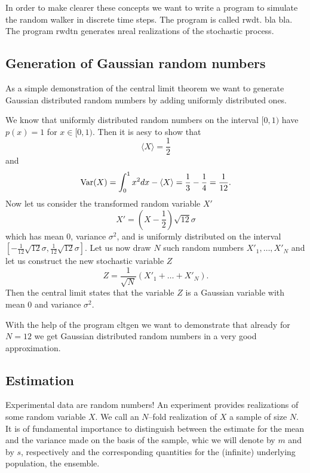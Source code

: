In order to make clearer these concepts we want to write a program 
to simulate the random walker in discrete time steps. The program
is called {\sf rwdt}. bla bla.
The program {\sf rwdtn} generates {\sf nreal} realizations of the 
stochastic process.

\subsection{Generation of Gaussian random numbers}
As a simple demonstration of the central limit theorem we want to 
generate Gaussian distributed random numbers by adding uniformly 
distributed ones.

We know that uniformly distributed random numbers on the interval
$[0,1)$ have $p(x) =1$ for $x\in[0,1)$. Then it is aesy to show 
that 
\begin{equation*}
\langle X\rangle = \frac{1}{2}
\end{equation*}
and
\begin{equation*}
{\rm Var}(X) = \int_0^1 x^2 dx - \langle X\rangle = \frac{1}{3} 
        -\frac{1}{4} = \frac{1}{12}.
\end{equation*}
Now let us consider the transformed random variable $X'$
\begin{equation*}
X' = (X - \frac{1}{2})\sqrt{12} \sigma
\end{equation*}
which has mean $0$, variance $\sigma^2$, and is uniformly 
distributed on the interval 
$[-\frac{1}{12} \sqrt{12} \sigma, \frac{1}{12} \sqrt{12} \sigma].$
Let us now draw $N$ such random numbers $X'_1,\ldots, X'_N$
and let us construct
the new stochastic variable $Z$
\begin{equation*}
Z= \frac{1}{\sqrt{N}} (X'_1 + \ldots + X'_N).
\end{equation*}
Then the central limit states that the variable $Z$ is a Gaussian
variable with mean $0$ and variance $\sigma^2$.

With the help of the program {\sf cltgen} we want to demonstrate 
that already for $N=12$ we get Gaussian distributed random numbers
in a very good approximation.

\subsection{Estimation}
Experimental data are random numbers! An experiment provides
realizations of some random variable $X$. We call an $N$--fold
realization of $X$ a sample of size $N$. It is of fundamental
importance to distinguish between the estimate for the mean and the
variance made on the basis of the sample, whic we will denote by $m$
and by $s$, respectively and the corresponding quantities for the
(infinite) underlying population, the ensemble.

